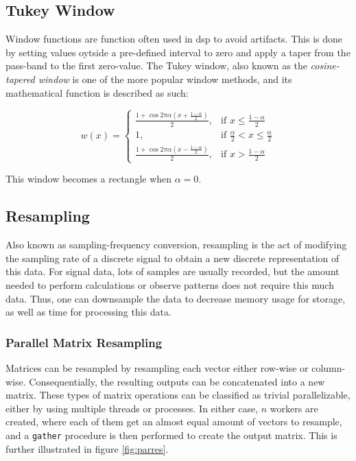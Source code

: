 \subsection{Tukey Window}
\label{dsp:tukey}

Window functions are function often used in \acrshort{dsp} to avoid artifacts. This is done by setting values oytside a pre-defined interval to zero and apply a taper from the pass-band to the first zero-value. The Tukey window, also known as the \textit{cosine-tapered window} is one of the more popular window methods, and its mathematical function is described as such: 

\[
    w(x)= 
\begin{cases}
    \frac{1 + \cos{2 \pi \alpha (x + \frac{1-\alpha}{2})}}{2}, & \text{if } x \leq \frac{1-\alpha}{2}\\
    1,              & \text{if } \frac{\alpha}{2} < x \leq \frac{\alpha}{2}\\
    \frac{1 + \cos{2 \pi \alpha (x - \frac{1-\alpha}{2})}}{2}, & \text{if } x > \frac{1-\alpha}{2}
\end{cases}
\]

This window becomes a rectangle when $\alpha = 0$.


\subsection{Resampling}

Also known as sampling-frequency conversion, resampling is the act of modifying the sampling rate of a discrete signal to obtain a new discrete representation of this data. For signal data, lots of samples are usually recorded, but the amount needed to perform calculations or observe patterns does not require this much data. Thus, one can downsample the data to decrease memory usage for storage, as well as time for processing this data. \\

\subsubsection{Parallel Matrix Resampling}

Matrices can be resampled by resampling each vector either row-wise or column-wise. Consequentially, the resulting outputs can be concatenated into a new matrix. These types of matrix operations can be classified as trivial parallelizable, either by using multiple threads or processes. In either case, $n$ workers are created, where each of them get an almost equal amount of vectors to resample, and a \texttt{gather} procedure is then performed to create the output matrix. This is further illustrated in figure \ref{fig:parres}.

